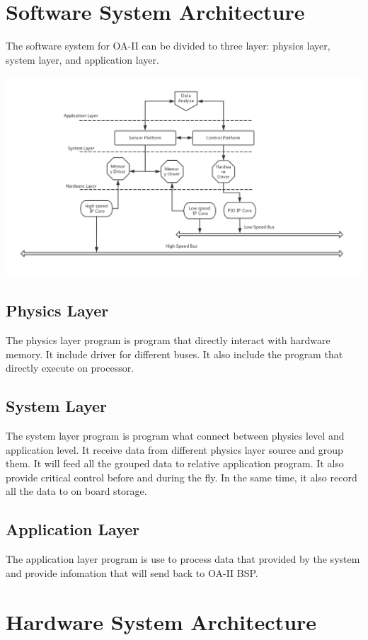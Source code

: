 \documentclass[12pt,article]{memoir}
\begin{document}
\section{Software System Architecture}
The software system for OA-II can be divided to three layer: physics layer, system layer, and application layer.

\includegraphics[width=\textwidth]{softarch.png}
\subsection{Physics Layer}
The physics layer program is program that directly interact with hardware memory. It include driver for different buses. It also include the program that directly execute on processor.
\subsection{System Layer}
The system layer program is program what connect between physics level and application level. It receive data from different physics layer source and group them. It will feed all the grouped data to relative application program. It also provide critical control before and during the fly. In the same time, it also record all the data to on board storage.
\subsection{Application Layer}
The application layer program is use to process data that provided by the system and provide infomation that will send back to OA-II BSP.

\section{Hardware System Architecture}
\end{document}
